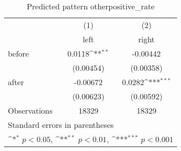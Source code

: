 \begin{table}[htbp]\centering
\def\sym#1{\ifmmode^{#1}\else\(^{#1}\)\fi}
\caption{Predicted pattern otherpositive\_rate}
\begin{tabular}{l*{2}{c}}
\hline\hline
                    &\multicolumn{1}{c}{(1)}&\multicolumn{1}{c}{(2)}\\
                    &\multicolumn{1}{c}{left}&\multicolumn{1}{c}{right}\\
\hline
before              &      0.0118\sym{**} &    -0.00442         \\
                    &   (0.00454)         &   (0.00358)         \\
[1em]
after               &    -0.00672         &      0.0282\sym{***}\\
                    &   (0.00623)         &   (0.00592)         \\
\hline
Observations        &       18329         &       18329         \\
\hline\hline
\multicolumn{3}{l}{\footnotesize Standard errors in parentheses}\\
\multicolumn{3}{l}{\footnotesize \sym{*} \(p<0.05\), \sym{**} \(p<0.01\), \sym{***} \(p<0.001\)}\\
\end{tabular}
\end{table}
